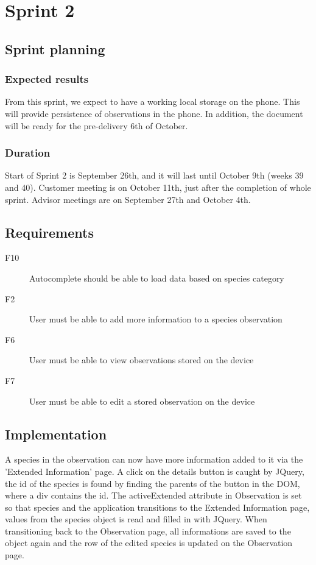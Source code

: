 \section{Sprint 2}

\subsection{Sprint planning}

	\subsubsection{Expected results}
  From this sprint, we expect to have a working local storage on the phone. This will provide persistence of observations in the phone. In addition, the document will be ready for the pre-delivery 6th of October.
	
	\subsubsection{Duration}
	Start of Sprint 2 is September 26th, and it will last until October 9th (weeks 39 and 40). Customer meeting is on October 11th, just after the completion of whole sprint. Advisor meetings are on September 27th and October 4th.

\subsection{Requirements}

\begin{description}
	\item[F10] Autocomplete should be able to load data based on species category
	\item[F2] User must be able to add more information to a species observation
	\item[F6] User must be able to view observations stored on the device
	\item[F7] User must be able to edit a stored observation on the device
\end{description}

\subsection{Implementation}

A species in the observation can now have more information added to it via the 'Extended Information' page.
A click on the details button is caught by JQuery, the id of the species is found by finding the parents of the button in the DOM, where a div contains the id.
The activeExtended attribute in Observation is set so that species and the application transitions to the Extended Information page, values from the species object is read and filled in with JQuery.
When transitioning back to the Observation page, all informations are saved to the object again and the row of the edited species is updated on the Observation page.

